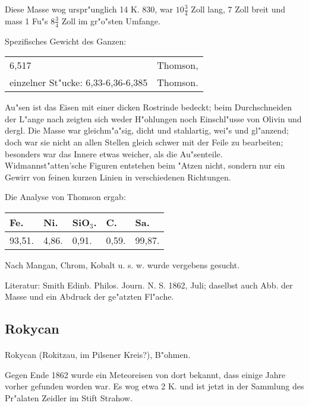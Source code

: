 \documentclass[a4paper, 11pt, oneside]{article}
\begin{document}
Diese Masse wog urspr"unglich 14 K. 830, war $10\frac{3}{4}$ Zoll lang, 7 Zoll breit und mass 1 Fu"s $8\frac{3}{4}$ Zoll im gr"o"sten Umfange.

Spezifisches Gewicht des Ganzen:
\begin{table}[!ht]
    \centering
    \begin{tabular}{l l}
        6,517 & Thomson,\\
        einzelner St"ucke: 6,33-6,36-6,385 & Thomson.
    \end{tabular}
\end{table}

Au"sen ist das Eisen mit einer dicken Rostrinde bedeckt; beim Durchschneiden der L"ange nach zeigten sich weder H"ohlungen noch Einschl"usse von Olivin und dergl. Die Masse war gleichm"a"sig, dicht und stahlartig, wei"s und gl"anzend; doch war sie nicht an allen Stellen gleich schwer mit der Feile zu bearbeiten; besonders war das Innere etwas weicher, als die Au"senteile. Widmannst"atten'sche Figuren entstehen beim "Atzen nicht, sondern nur ein Gewirr von feinen kurzen Linien in verschiedenen Richtungen.

Die Analyse von Thomson ergab:
\begin{table}[H]
    \centering
    \begin{tabular}{l l l l l}
        Fe. & Ni. & SiO$_{3}$. & C. & Sa. \\ \hline
        93,51. & 4,86. & 0,91. & 0,59. & 99,87. \\
    \end{tabular}
\end{table}

Nach Mangan, Chrom, Kobalt u. s. w. wurde vergebens gesucht.

\footnotesize
Literatur: Smith Edinb. Philos. Journ. N. S. 1862, Juli; daselbst auch Abb. der Masse und ein Abdruck der ge"atzten Fl"ache.

\subsection{Rokycan}
\normalsize
\paragraph{}
Rokycan (Rokitzau, im Pilsener Kreis?), B"ohmen.

Gegen Ende 1862 wurde ein Meteoreisen von dort bekannt, dass einige Jahre vorher gefunden worden war. Es wog etwa 2 K. und ist jetzt in der Sammlung des Pr"alaten Zeidler im Stift Strahow.
\end{document}
